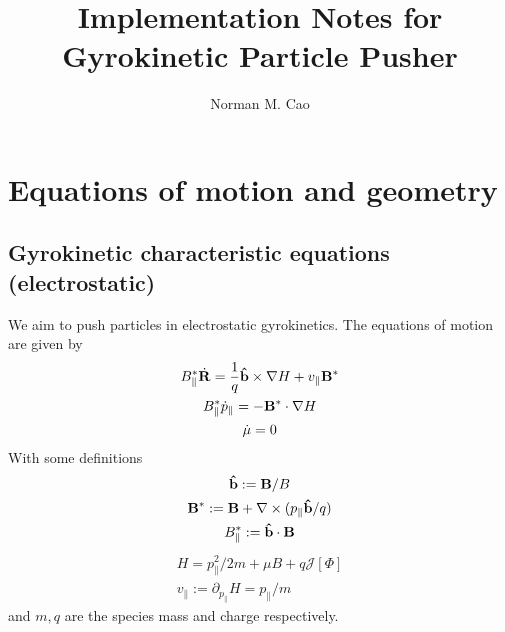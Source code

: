 \documentclass[]{article}
\title{Implementation Notes for Gyrokinetic Particle Pusher}
\author{Norman M. Cao}
\begin{document}
\maketitle

\section{Equations of motion and geometry}

\subsection{Gyrokinetic characteristic equations (electrostatic)}
We aim to push particles in electrostatic gyrokinetics.
The equations of motion are given by
\begin{subequations}
	\begin{gather}
		B_\parallel^* \dot{\vb{R}} = \frac{1}{q} \vu{b} \times \nabla H + v_\parallel \vb{B}^* \\
		B_\parallel^* \dot{p}_\parallel = -\vb{B}^* \cdot \nabla H \\
		\dot{\mu} = 0
	\end{gather}
\end{subequations}
With some definitions
\begin{subequations}
	\begin{gather}
		\vu{b} := \vb{B} / B \\
		\vb{B}^* := \vb{B} + \nabla \times (p_\parallel \vu{b} / q) \\
		B_\parallel^* := \vu{b} \cdot \vb{B}
	\end{gather}
\end{subequations}
\begin{subequations}
	\begin{gather}
		H = p_\parallel^2 / 2 m + \mu B + q \mathcal{J}[\Phi] \\
		v_\parallel := \partial_{p_\parallel} H = p_\parallel / m
	\end{gather}
\end{subequations}
and \(m,q\) are the species mass and charge respectively.
\end{document}
